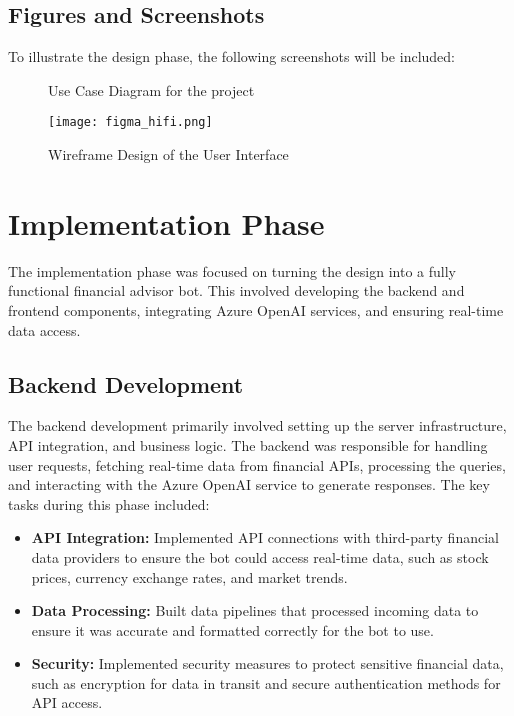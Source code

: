 \documentclass[a4paper,12pt]{report}
\begin{document}
\subsection*{Figures and Screenshots}
To illustrate the design phase, the following screenshots will be included:
\begin{figure}[H]
    \centering
    
    \caption{Use Case Diagram for the project}
\end{figure}

\begin{figure}[H]
    \centering
    \texttt{[image: figma\_hifi.png]}
    \caption{Wireframe Design of the User Interface}
    \label{fig:ui-wireframe}
\end{figure}


\section{Implementation Phase}
The implementation phase was focused on turning the design into a fully functional financial advisor bot. This involved developing the backend and frontend components, integrating Azure OpenAI services, and ensuring real-time data access.

\subsection*{Backend Development}
The backend development primarily involved setting up the server infrastructure, API integration, and business logic. The backend was responsible for handling user requests, fetching real-time data from financial APIs, processing the queries, and interacting with the Azure OpenAI service to generate responses. The key tasks during this phase included:
\begin{itemize}
    \item \textbf{API Integration:} Implemented API connections with third-party financial data providers to ensure the bot could access real-time data, such as stock prices, currency exchange rates, and market trends.
    \item \textbf{Data Processing:} Built data pipelines that processed incoming data to ensure it was accurate and formatted correctly for the bot to use.
    \item \textbf{Security:} Implemented security measures to protect sensitive financial data, such as encryption for data in transit and secure authentication methods for API access.
\end{itemize}
\end{document}
